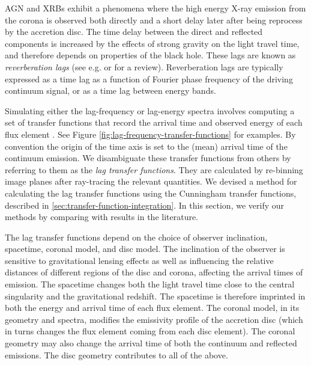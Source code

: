 \documentclass[fleqn,usenatbib]{mnras}
\begin{document}
AGN and XRBs exhibit a phenomena where the high energy X-ray emission from the
corona is observed both directly and a short delay later after being reprocess
by the accretion disc. The time delay between the direct and reflected
components is increased by the effects of strong gravity on the light travel
time, and therefore depends on properties of the black hole. These lags are
known as \textit{reverberation lags} (see e.g. \cite{uttley_x-ray_2014} or
\cite{cackett_reverberation_2021} for a review). Reverberation lags are
typically expressed as a time lag as a function of Fourier phase frequency of
the driving continuum signal, or as a time lag between energy bands.

Simulating either the lag-frequency or lag-energy spectra involves computing a
set of transfer functions that record the arrival time and observed energy of
each flux element \citep{reynolds_x-ray_1999}. See Figure
\ref{fig:lag-frequency-transfer-functions} for examples. By convention the
origin of the time axis is set to the (mean) arrival time of the continuum
emission. We disambiguate these transfer functions from others by referring to
them as the \textit{lag transfer functions}. They are calculated by re-binning
image planes after ray-tracing the relevant quantities. We devised a method for
calculating the lag transfer functions using the Cunningham transfer functions,
described in \ref{sec:transfer-function-integration}. In this section, we verify
our methods by comparing with results in the literature.

The lag transfer functions depend on the choice of observer inclination,
spacetime, coronal model, and disc model. The inclination of the observer is
sensitive to gravitational lensing effects as well as influencing the relative
distances of different regions of the disc and corona, affecting the arrival
times of emission. The spacetime changes both the light travel time close to the
central singularity and the gravitational redshift. The spacetime is therefore
imprinted in both the energy and arrival time of each flux element.  The coronal
model, in its geometry and spectra, modifies the emissivity profile of the
accretion disc (which in turns changes the flux element coming from each disc
element). The coronal geometry may also change the arrival time of both the
continuum and reflected emissions. The disc geometry contributes to all of the
above.

\end{document}
